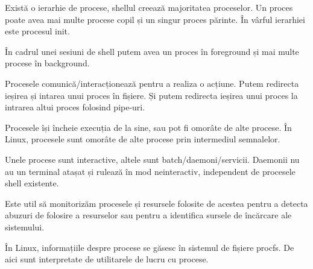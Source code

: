 Există o ierarhie de procese, shellul creează majoritatea proceselor.
Un proces poate avea mai multe procese copil și un singur proces părinte.
În vârful ierarhiei este procesul init.

În cadrul unei sesiuni de shell putem avea un proces în foreground și mai multe procese în background.

Procesele comunică/interacționează pentru a realiza o acțiune.
Putem redirecta ieșirea și intarea unui proces în fișiere.
Și putem redirecta ieșirea unui proces la intrarea altui proces folosind pipe-uri.

Procesele își încheie execuția de la sine, sau pot fi omorâte de alte procese.
În Linux, procesele sunt omorâte de alte procese prin intermediul semnalelor.

Unele procese sunt interactive, altele sunt batch/daemoni/servicii.
Daemonii nu au un terminal atașat și rulează în mod neinteractiv, independent de procesele shell existente.

Este util să monitorizăm procesele și resursele folosite de acestea pentru a detecta abuzuri de folosire a resurselor sau pentru a identifica sursele de încărcare ale sistemului.

În Linux, informațiile despre procese se găsesc în sistemul de fișiere procfs.
De aici sunt interpretate de utilitarele de lucru cu procese.
